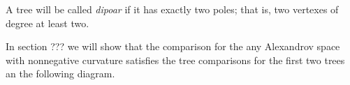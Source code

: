 A tree will be called \emph{dipoar} if it has exactly two poles;
that is, two vertexes of degree at least two.

In section ??? we will show that the comparison for the any Alexandrov space with nonnegative curvature satisfies the tree comparisons for the first two trees an the following diagram.

\begin{comment}
\begin{center}

\begin{tikzpicture}[scale=1,
  thick,main node/.style={circle,draw,font=\sffamily\bfseries,minimum size=3mm}]

  \node[main node] (1) at (0,0) {};
  \node[main node] (2) at (0,1){};
  \node[main node] (3) at (0,2){};
  \node[main node] (4) at (1,0) {};
  \node[main node] (5) at (1,1) {};
  \node[main node] (6) at (1,2) {};

  \path[every node/.style={font=\sffamily\small}]
   (1) edge node[above]{}(2)
   (2) edge node[above]{}(3)
   (2) edge node[above]{}(5)
   (4) edge node[above]{}(5)
   (5) edge node[above]{}(6);
\end{tikzpicture}
\hskip10mm
\begin{tikzpicture}[scale=1,
  thick,main node/.style={circle,draw,font=\sffamily\bfseries,minimum size=3mm}]

  \node[main node] (1) at (0,1) {};
  \node[main node] (2) at (1,0){};
  \node[main node] (3) at (1,1){};
  \node[main node] (4) at (1,2) {};
  \node[main node] (5) at (2,0) {};
  \node[main node] (6) at (2,1) {};

  \path[every node/.style={font=\sffamily\small}]
   (1) edge node[above]{}(3)
   (2) edge node[above]{}(3)
   (3) edge node[above]{}(6)
   (4) edge node[above]{}(3)
   (5) edge node[above]{}(6);
\end{tikzpicture}
\hskip10mm
\begin{tikzpicture}[scale=1,
  thick,main node/.style={circle,draw,font=\sffamily\bfseries,minimum size=3mm}]

  \node[main node] (0) at (1/6,1/2) {};
   \node[main node] (1) at (1/6,3/2) {};
  \node[main node] (2) at (1,0){};
  \node[main node] (3) at (1,1){};
  \node[main node] (4) at (1,2) {};
  \node[main node] (5) at (2,0) {};
  \node[main node] (6) at (2,1) {};

  \path[every node/.style={font=\sffamily\small}]
     (0) edge node[above]{}(3)
   (1) edge node[above]{}(3)
   (2) edge node[above]{}(3)
   (3) edge node[above]{}(6)
   (4) edge node[above]{}(3)
   (5) edge node[above]{}(6);
\end{tikzpicture}

\end{center}
\end{comment}

